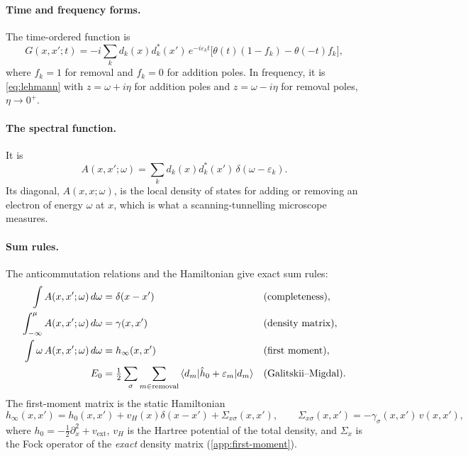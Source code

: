 \documentclass[11pt,a4paper]{article}
\begin{document}
\paragraph{Time and frequency forms.} The time-ordered function is
\begin{equation}
G(x,x';t) = -i\sum_k d_k(x)d_k^*(x')\,e^{-i\varepsilon_k t}\big[\theta(t)(1-f_k) - \theta(-t)f_k\big],
\label{eq:G-time}
\end{equation}
where $f_k=1$ for removal and $f_k=0$ for addition poles. In frequency, it is \cref{eq:lehmann} with $z = \omega + i\eta$ for addition poles and $z = \omega - i\eta$ for removal poles, $\eta\to0^+$.

\paragraph{The spectral function.} It is
\begin{equation}
A(x,x';\omega) = \sum_k d_k(x)d_k^*(x')\,\delta(\omega-\varepsilon_k).
\end{equation}
Its diagonal, $A(x,x;\omega)$, is the local density of states for adding or removing an electron of energy $\omega$ at $x$, which is what a scanning-tunnelling microscope measures.

\paragraph{Sum rules.} The anticommutation relations and the Hamiltonian give exact sum rules:
\begin{align}
\int A(x,x';\omega)\,d\omega &= \delta(x-x') &&\text{(completeness)},\label{eq:completeness}\\
\int_{-\infty}^{\mu} A(x,x';\omega)\,d\omega &= \gamma(x,x') &&\text{(density matrix)},\\
\int \omega\,A(x,x';\omega)\,d\omega &= h_\infty(x,x') &&\text{(first moment)},\label{eq:first-moment}\\
E_0 &= \tfrac12\sum_\sigma\sum_{m\in\text{removal}}\braket{d_m|\hat h_0+\varepsilon_m|d_m} &&\text{(Galitskii--Migdal)}.\label{eq:gm}
\end{align}
The first-moment matrix is the static Hamiltonian
\begin{equation}
h_\infty(x,x') = h_0(x,x') + v_H(x)\delta(x-x') + \Sigma_{x\sigma}(x,x'),
\qquad
\Sigma_{x\sigma}(x,x') = -\gamma_\sigma(x,x')\,v(x,x'),
\label{eq:hinf}
\end{equation}
where $h_0 = -\tfrac12\partial_x^2 + v_\text{ext}$, $v_H$ is the Hartree potential of the total density, and $\Sigma_x$ is the Fock operator of the \emph{exact} density matrix (\cref{app:first-moment}).
\end{document}
